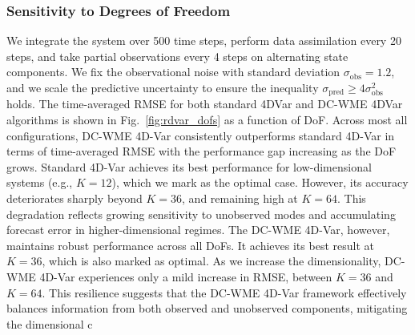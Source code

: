 \documentclass[final,1p,times]{elsarticle}
\begin{document}

\subsubsection{Sensitivity to Degrees of Freedom}
We integrate the system over 500 time steps, perform data assimilation every 20 steps, and take partial observations every 4 steps on alternating state components. We fix the observational noise with standard deviation $ \sigma_{\text{obs}} = 1.2 $, and we scale the predictive uncertainty to ensure the inequality $ \sigma_{\text{pred}} \ge 4\sigma_{\text{obs}}^2 $ holds.
The time-averaged RMSE for both standard 4DVar and DC-WME 4DVar algorithms is shown in Fig.~\ref{fig:rdvar_dofs} as a function of DoF.
Across most all configurations, DC-WME 4D-Var consistently outperforms standard 4D-Var in terms of time-averaged RMSE with the performance gap increasing as the DoF grows. Standard 4D-Var achieves its best performance for low-dimensional systems (e.g., $ K = 12 $), which we mark as the optimal case. However, its accuracy deteriorates sharply beyond $ K = 36 $,  and remaining high at $ K = 64 $. This degradation reflects growing sensitivity to unobserved modes and accumulating forecast error in higher-dimensional regimes. The DC-WME 4D-Var, however, maintains robust performance across all DoFs. It achieves its best result at $K = 36$, which is also marked as optimal. 
As we increase the dimensionality, DC-WME 4D-Var experiences only a mild increase in RMSE, between $ K = 36 $ and $ K = 64 $. This resilience suggests that the DC-WME 4D-Var framework effectively balances information from both observed and unobserved components, mitigating the dimensional c
\end{document}
